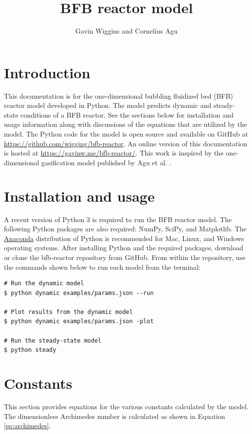 \documentclass[12pt,titlepage]{article}
\title{\textbf{BFB reactor model}}
\author{Gavin Wiggins and Cornelius Agu}
\begin{document}
\maketitle
\tableofcontents
\newpage

\section{Introduction}

This documentation is for the one-dimensional bubbling fluidized bed (BFB) reactor model developed in Python. The model predicts dynamic and steady-state conditions of a BFB reactor. See the sections below for installation and usage information along with discussions of the equations that are utilized by the model. The Python code for the model is open source and available on GitHub at \url{https://github.com/wigging/bfb-reactor}. An online version of this documentation is hosted at \url{https://gavinw.me/bfb-reactor/}. This work is inspired by the one-dimensional gasification model published by Agu et al. \cite{Agu-2019f}.

\section{Installation and usage}

A recent version of Python 3 is required to run the BFB reactor model. The following Python packages are also required: NumPy, SciPy, and Matplotlib. The \href{https://www.anaconda.com/products/individual}{Anaconda} distribution of Python is recommended for Mac, Linux, and Windows operating systems. After installing Python and the required packages, download or clone the bfb-reactor repository from GitHub. From within the repository, use the commands shown below to run each model from the terminal:

\begin{verbatim}
# Run the dynamic model
$ python dynamic examples/params.json --run

# Plot results from the dynamic model
$ python dynamic examples/params.json -plot

# Run the steady-state model
$ python steady
\end{verbatim}

\section{Constants}

This section provides equations for the various constants calculated by the model. The dimensionless Archimedes number is calculated as shown in Equation \ref{eq:archimedes}.
\end{document}
